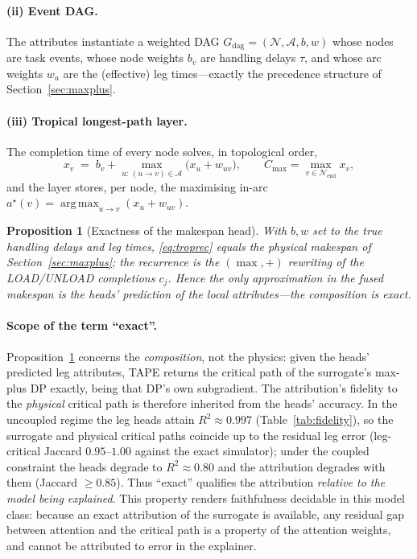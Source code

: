 \documentclass[11pt]{article}
\newtheorem{proposition}{Proposition}
\newcommand{\Cmax}{C_{\max}}
\newcommand{\argmax}{\operatorname*{arg\,max}}
\begin{document}
\paragraph{(ii) Event DAG.} The attributes instantiate a weighted DAG
$G_{\mathrm{dag}}=(\mathcal N,\mathcal A,b,w)$ whose nodes are task events, whose node
weights $b_v$ are handling delays $\tau$, and whose arc weights $w_a$ are the (effective) leg
times---exactly the precedence structure of Section~\ref{sec:maxplus}.

\paragraph{(iii) Tropical longest-path layer.} The completion time of every node solves, in
topological order,
\begin{equation}
x_v \;=\; b_v + \max_{u:\,(u\to v)\in\mathcal A}\big(x_u + w_{uv}\big),
\qquad \Cmax=\max_{v\in\mathcal N_{\mathrm{end}}} x_v ,
\label{eq:troprec}
\end{equation}
and the layer stores, per node, the maximising in-arc $a^\star(v)=\argmax_{u\to v}(x_u+w_{uv})$.

\begin{proposition}[Exactness of the makespan head]
\label{prop:exact}
With $b,w$ set to the true handling delays and leg times, \eqref{eq:troprec} equals the
physical makespan of Section~\ref{sec:maxplus}; the recurrence is the $(\max,+)$ rewriting of
the LOAD/UNLOAD completions $c_j$. Hence the only approximation in the fused makespan is the
heads' prediction of the local attributes---the \emph{composition} is exact.
\end{proposition}

\paragraph{Scope of the term ``exact''.}
Proposition~\ref{prop:exact} concerns the \emph{composition}, not the physics: given the
heads' predicted leg attributes, TAPE returns the critical path of the surrogate's max-plus
DP exactly, being that DP's own subgradient. The
attribution's fidelity to the \emph{physical} critical path is therefore inherited from the
heads' accuracy. In the uncoupled regime the leg heads attain $R^2\approx0.997$
(Table~\ref{tab:fidelity}), so the surrogate and physical critical paths coincide up to the
residual leg error (leg-critical Jaccard $0.95$--$1.00$ against the exact simulator);
under the coupled constraint the heads degrade to $R^2\approx0.80$ and the
attribution degrades with them (Jaccard $\geq0.85$). Thus ``exact'' qualifies the attribution
\emph{relative to the model being explained}. This property renders faithfulness
decidable in this model class: because an exact attribution of
the surrogate is available, any residual gap between attention and the critical path is a
property of the attention weights, and cannot be attributed to error in the explainer.
\end{document}
